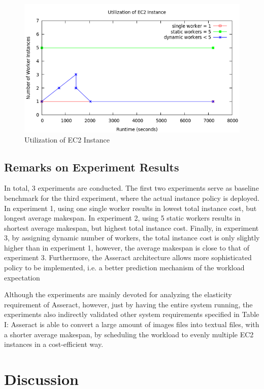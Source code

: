 \documentclass[conference]{IEEEtran}
\begin{document}
\begin{figure}[H]
\centering
        \includegraphics[totalheight=6cm,width=\linewidth]{instanceusage.png}
    \caption{Utilization of EC2 Instance}
    \label{fig:instanceusage}
\end{figure}

\subsection{Remarks on Experiment Results}\label{sec:experimentremark}
In total, 3 experiments are conducted. The first two experiments serve as baseline benchmark for the third experiment, where the actual instance policy is deployed.  In experiment 1, using one single worker results in lowest total instance cost, but longest average makespan. In experiment 2, using 5 static workers results in shortest average makespan, but highest total instance cost. Finally, in experiment 3, by assigning dynamic number of workers, the total instance cost is only slightly higher than in experiment 1, however, the average makespan is close to that of experiment 3. Furthermore, the Asseract architecture allows more sophisticated policy to be implemented, i.e. a better prediction mechanism of the workload expectation 

Although the experiments are mainly devoted for analyzing the elasticity requirement of Asseract, however, just by having the entire system running, the experiments also indirectly validated other system requirements specified in Table I: Asseract is able to convert a large amount of images ﬁles into textual ﬁles, with a shorter average makespan, by scheduling the workload to evenly multiple EC2 instances in a cost-efficient way.

\section{Discussion}
\end{document}
